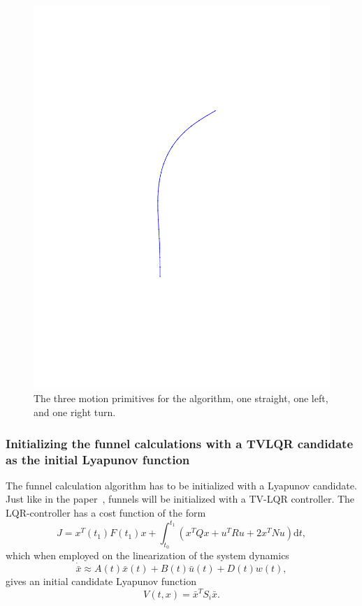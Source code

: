 \begin{figure}
\begin{minipage}[b]{0.4\textwidth}
    \includegraphics[width=\textwidth]{figures/method/right-trajector}
  \end{minipage}
  \caption{The three motion primitives for the \rrtfunnel{} algorithm, one
    straight, one left, and one right turn.}
  \label{fig:initial-trajectories}
\end{figure}


\subsubsection{Initializing the funnel calculations with a TVLQR candidate as
  the initial Lyapunov function}

The funnel calculation algorithm has to be initialized with a Lyapunov
candidate. Just like in the paper~\cite{majumdarFunnelLibrariesRealtime2017},
funnels will be initialized with a \ac{TV-LQR} controller. The
\ac{LQR}-controller has a cost function of the form
\begin{equation}
  J = x^{T}(t_1)F(t_1)x + \int_{t_{0}}^{t_{1}} \left( x^{T}Qx + u^{T}Ru + 2x^TNu \right) \mathrm{d}t,
\end{equation}
which when employed on the linearization of the system dynamics
\begin{equation}
  \dot{\bar{x}} \approx A(t)\bar{x}(t) + B(t)\bar{u}(t) +D(t)w(t),
\end{equation}
gives an initial candidate Lyapunov function
\begin{equation}
  V(t,x) = {\bar{x}}^{T}S_{i}\bar{x}.
\end{equation}

